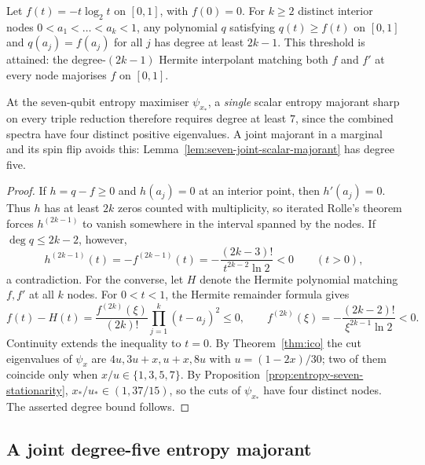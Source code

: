 \begin{proposition}\label{prop:seven-entropy-majorant-degree}
Let \(f(t)=-t\log_2t\) on \([0,1]\), with \(f(0)=0\).
For \(k\ge2\) distinct interior nodes \(0<a_1<\dots<a_k<1\),
any polynomial \(q\) satisfying \(q(t)\ge f(t)\) on \([0,1]\)
and \(q(a_j)=f(a_j)\) for all \(j\) has degree at least
\(2k-1\). This threshold is attained: the degree-\((2k-1)\)
Hermite interpolant matching both \(f\) and \(f'\) at every node
majorises \(f\) on \([0,1]\).

At the seven-qubit entropy maximiser \(\psi_{x_*}\), a
\emph{single} scalar entropy majorant sharp on every triple
reduction therefore requires degree at least \(7\), since the
combined spectra have four distinct positive eigenvalues.
A joint majorant in a marginal and its spin flip avoids this:
Lemma~\ref{lem:seven-joint-scalar-majorant} has degree five.
\end{proposition}
\begin{proof}
If \(h=q-f\ge0\) and \(h(a_j)=0\) at an interior point,
then \(h'(a_j)=0\). Thus \(h\) has at least \(2k\)
zeros counted with multiplicity, so iterated Rolle's theorem
forces \(h^{(2k-1)}\) to vanish somewhere in the interval
spanned by the nodes. If \(\deg q\le2k-2\), however,
\[
 h^{(2k-1)}(t)=-f^{(2k-1)}(t)
 =-\frac{(2k-3)!}{t^{2k-2}\ln2}<0
 \qquad (t>0),
\]
a contradiction. For the converse, let \(H\) denote the
Hermite polynomial matching \(f,f'\) at all \(k\) nodes.
For \(0<t<1\), the Hermite remainder formula gives
\[
 f(t)-H(t)
 =\frac{f^{(2k)}(\xi)}{(2k)!}
   \prod_{j=1}^k(t-a_j)^2
 \le0,
 \qquad
 f^{(2k)}(\xi)
 =-\frac{(2k-2)!}{\xi^{2k-1}\ln2}<0.
\]
Continuity extends the inequality to \(t=0\).
By Theorem~\ref{thm:ico} the cut eigenvalues of \(\psi_x\) are
\(4u,3u+x,u+x,8u\) with \(u=(1-2x)/30\); two of them coincide
only when \(x/u\in\{1,3,5,7\}\). By
Proposition~\ref{prop:entropy-seven-stationarity},
\(x_*/u_*\in(1,37/15)\), so the cuts of \(\psi_{x_*}\) have four
distinct nodes. The asserted degree bound follows.
\end{proof}

\subsection{A joint degree-five entropy majorant}
\label{sec:seven-joint-entropy-majorant}

